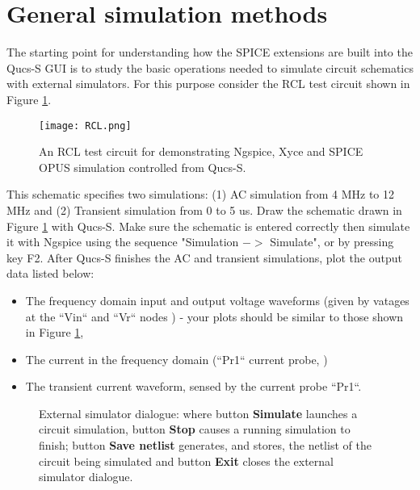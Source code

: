 \section{General simulation methods}
The starting point for understanding how the SPICE extensions are built into the Qucs-S GUI is to study the basic operations needed to simulate  circuit schematics with external simulators. For this purpose consider the RCL test circuit shown in Figure \ref{Fig8}.
\begin{figure}[h]
	\centering
	\texttt{[image: RCL.png]}
	\caption{An RCL test circuit for demonstrating Ngspice, Xyce and SPICE OPUS simulation controlled from Qucs-S.}
	\label{Fig8}
\end{figure}
This schematic specifies two simulations: (1) AC simulation from 4 MHz to 12 MHz and (2) Transient simulation from 0 to 5 us. Draw the schematic drawn in Figure \ref{Fig8} with Qucs-S.  Make sure the schematic is entered correctly then simulate it with Ngspice using the sequence "Simulation $->$ Simulate", or by pressing key F2. After Qucs-S finishes the AC and transient simulations, plot the output data listed below:
\begin{itemize}
	\item {The frequency domain input and output voltage waveforms (given by vatages at the ``Vin`` and ``Vr`` nodes ) - your plots should be similar to those shown in Figure \ref{Fig8}, }
	\item{The current in the frequency domain (``Pr1`` current probe, )}
	\item{The transient current waveform, sensed by the current probe ``Pr1``.}
\end{itemize}

\begin{figure}[ht]
	\centering
	\caption{ External simulator dialogue: where button \textbf{Simulate} launches a circuit simulation, button \textbf{Stop} causes a running simulation to finish; button \textbf{Save netlist} generates, and stores, the netlist of the circuit being simulated and button \textbf{Exit} closes the external simulator dialogue.}
	\label{Fig9}
\end{figure}

